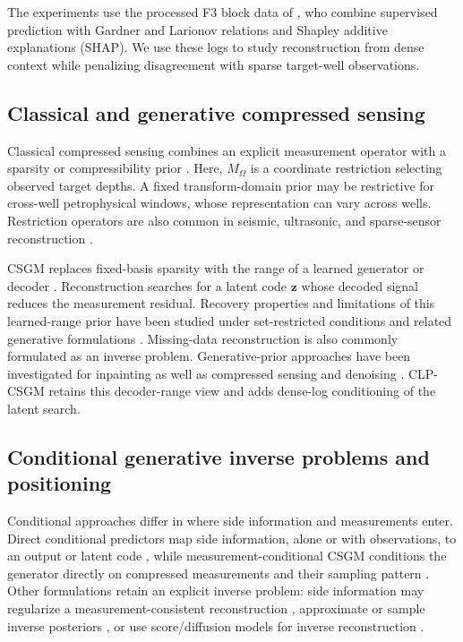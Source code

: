 The experiments use the processed F3 block data of
\citet{zhang2025rockphysicslogs}, who combine supervised prediction with
Gardner and Larionov relations and Shapley additive explanations (SHAP).
We use these logs
to study reconstruction from dense context while penalizing disagreement
with sparse target-well observations.


\subsection{Classical and generative compressed sensing}

Classical compressed sensing combines an explicit measurement operator with a
sparsity or compressibility prior
\citep{donoho2006compressed,candes2006robust,candes2006stable}. Here,
$M_\Omega$ is a coordinate restriction selecting observed target depths. A fixed
transform-domain prior may be restrictive for cross-well petrophysical windows,
whose representation can vary across wells. Restriction operators are also common
in seismic, ultrasonic, and sparse-sensor reconstruction
\citep{herrmann2008nonparametric,hennenfent2008simplydenoise,deAssis2022CompressiveSF,
muir2021seismicwavefield,dasilva2025csshredenhancingshredrobust}.

CSGM replaces fixed-basis sparsity with the range of a
learned generator or decoder \citep{bora2017compressed}. Reconstruction searches
for a latent code $\boldsymbol{z}$ whose decoded signal reduces the
measurement residual.
Recovery properties and limitations of this learned-range prior have been studied
under set-restricted conditions and related generative formulations
\citep{bora2017compressed,kamath2020power,asim2020invertible}.
Missing-data reconstruction is also commonly formulated as an inverse
problem. Generative-prior approaches have been investigated for inpainting
as well as compressed sensing and denoising \citep{asim2020invertible}.
CLP-CSGM retains
this decoder-range view and adds dense-log conditioning of the latent search.



\subsection{Conditional generative inverse problems and positioning}

Conditional approaches differ in where side information and measurements enter.
Direct conditional predictors map side information, alone or with observations,
to an output or latent code \citep{mirza2014conditional,sohn2015learning}, while
measurement-conditional CSGM conditions the generator directly on compressed
measurements and their sampling pattern \citep{kim2021measurementconditional}.
Other formulations retain an explicit inverse problem: side information may
regularize a measurement-consistent reconstruction
\citep{ongie2020deep,lucas2018using}, approximate or sample inverse posteriors
\citep{adler2018deepbayes,altekruger2024robustcgm,bendel2024rcgan}, or use
score/diffusion models for inverse reconstruction
\citep{dasgupta2024mechanicsdiffusion,jacobsen2025cocogen}.


